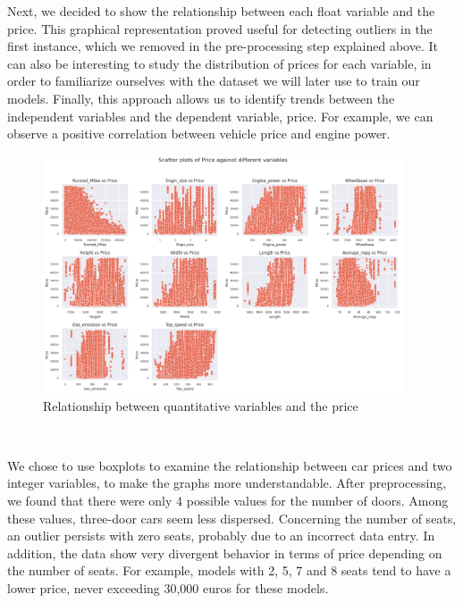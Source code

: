 \documentclass[12pt]{article}
\begin{document}
\noindent Next, we decided to show the relationship between each float variable and the price. This graphical representation proved useful for detecting outliers in the first instance, which we removed in the pre-processing step explained above. It can also be interesting to study the distribution of prices for each variable, in order to familiarize ourselves with the dataset we will later use to train our models. Finally, this approach allows us to identify trends between the independent variables and the dependent variable, price. For example, we can observe a positive correlation between vehicle price and engine power.

\begin{figure}[ht]
    \centering
    \includegraphics[width=0.95\textwidth]{numerique variables.png}
    \caption{Relationship between quantitative variables and the price}
    \label{fig:boxplot}
\end{figure}
\\
\FloatBarrier

\noindent We chose to use boxplots to examine the relationship between car prices and two integer variables, to make the graphs more understandable. After preprocessing, we found that there were only 4 possible values for the number of doors. Among these values, three-door cars seem less dispersed. Concerning the number of seats, an outlier persists with zero seats, probably due to an incorrect data entry. In addition, the data show very divergent behavior in terms of price depending on the number of seats. For example, models with 2, 5, 7 and 8 seats tend to have a lower price, never exceeding 30,000 euros for these models.
\end{document}

